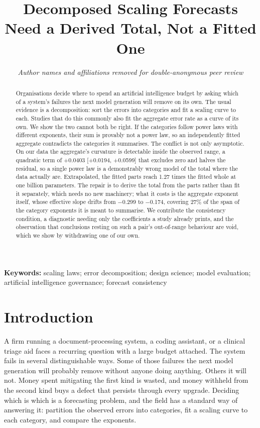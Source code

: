\documentclass[11pt]{article}
\title{\bf Decomposed Scaling Forecasts Need a Derived Total, Not a Fitted One}
\author{\normalsize\itshape Author names and affiliations removed for
  double-anonymous peer review}
\date{}
\begin{document}
\maketitle

\begin{abstract}
Organisations decide where to spend an artificial intelligence budget by asking
which of a system's failures the next model generation will remove on its own. The
usual evidence is a decomposition: sort the errors into categories and fit a scaling
curve to each. Studies that do this commonly also fit the aggregate error rate as a
curve of its own. We show the two cannot both be right. If the categories follow
power laws with different exponents, their sum is provably not a power law, so an
independently fitted aggregate contradicts the categories it summarises. The
conflict is not only asymptotic. On our data the aggregate's curvature is
detectable inside the observed range, a quadratic term of +0.0403
[+0.0194, +0.0599] that excludes zero and halves the residual, so a
single power law is a demonstrably wrong model of the total where the data actually
are. Extrapolated, the fitted parts reach 1.27 times the fitted whole
at one billion parameters. The repair is to derive the total from the parts rather
than fit it separately, which needs no new machinery; what it costs is the aggregate
exponent itself, whose effective slope drifts from $-$0.299 to
$-$0.174, covering 27\% of the span of the category
exponents it is meant to summarise. We contribute the consistency condition, a
diagnostic needing only the coefficients a study already prints, and the observation
that conclusions resting on such a pair's out-of-range behaviour are void, which we
show by withdrawing one of our own.
\end{abstract}

\vspace{0.5em}
\noindent\textbf{Keywords:} scaling laws; error decomposition; design science;
model evaluation; artificial intelligence governance; forecast consistency

\section{Introduction}
\label{sec:intro}

A firm running a document-processing system, a coding assistant, or a clinical
triage aid faces a recurring question with a large budget attached. The system
fails in several distinguishable ways. Some of those failures the next model
generation will probably remove without anyone doing anything. Others it will not.
Money spent mitigating the first kind is wasted, and money withheld from the second
kind buys a defect that persists through every upgrade. Deciding which is which is
a forecasting problem, and the field has a standard way of answering it: partition
the observed errors into categories, fit a scaling curve to each category, and
compare the exponents.
\end{document}
